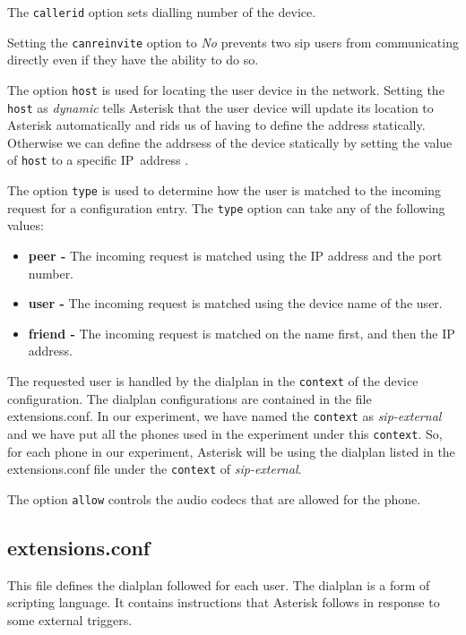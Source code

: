 The \texttt{callerid} option sets dialling number of the device.

Setting the \texttt{canreinvite} option to \textsl{No} prevents two \gls{sip} users
from communicating directly even if they have the ability to do so.

The option \texttt{host} is used for locating the user device in the network.
Setting the \texttt{host} as \textsl{dynamic} tells Asterisk that the user
device will update its location to Asterisk automatically and rids us of having
to define the address statically. Otherwise we can define the addrsess of the
device statically by setting the value of \texttt{host} to a specific 
IP~address \cite{docAstrsk}.

The option \texttt{type} is used to determine how the user is matched to the 
incoming request for a configuration entry. The \texttt{type} option can take any 
of the following values:
\begin{itemize}[noitemsep,topsep=0pt,parsep=0pt,partopsep=0pt]
    \item \textbf{peer -} The incoming request is matched using the IP
    address and the port number.
    \item \textbf{user -} The incoming request is matched using the 
    device name of the user.
    \item \textbf{friend -} The incoming request is matched on the name first,
    and then the IP address.
\end{itemize}

The requested user is handled by the dialplan in the \texttt{context} of the
device configuration. The dialplan configurations are contained in the
file \textsf{extensions.conf}. In our experiment, we have named the
\texttt{context} as \textsl{sip-external} and we have put all the phones used
in the experiment under this \texttt{context}. So, for each phone in our
experiment, Asterisk will be using the dialplan listed in the
\textsf{extensions.conf} file under the \texttt{context} of
\textsl{sip-external}.


The option \texttt{allow} controls the audio codecs that are allowed for the
phone.


\subsection{extensions.conf}

This file defines the dialplan followed for each user. The dialplan is a form
of scripting language. It contains instructions that Asterisk follows in 
response to some external triggers.

